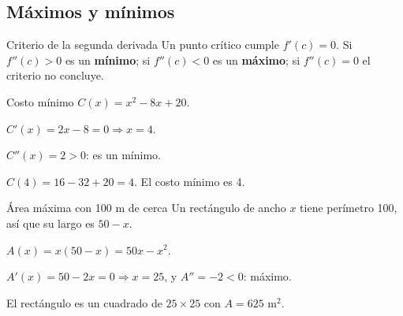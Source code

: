 

\subsection{M\'aximos y m\'inimos}
\begin{tmdef}{Criterio de la segunda derivada}
Un punto cr\'itico cumple $f'(c)=0$. Si $f''(c)>0$ es un \textbf{m\'inimo}; si $f''(c)<0$ es un \textbf{m\'aximo}; si $f''(c)=0$ el criterio no concluye.
\end{tmdef}

\begin{center}
\end{center}

\begin{tmejemplo}{Costo m\'inimo}
$C(x)=x^2-8x+20$.
\begin{tmpasos}
\item $C'(x)=2x-8=0\Rightarrow x=4$.
\item $C''(x)=2>0$: es un m\'inimo.
\item $C(4)=16-32+20=4$. El costo m\'inimo es 4.
\end{tmpasos}
\end{tmejemplo}

\begin{tmejemplo}{\'Area m\'axima con 100 m de cerca}
Un rect\'angulo de ancho $x$ tiene per\'imetro 100, as\'i que su largo es $50-x$.
\begin{tmpasos}
\item $A(x)=x(50-x)=50x-x^2$.
\item $A'(x)=50-2x=0\Rightarrow x=25$, y $A''=-2<0$: m\'aximo.
\item El rect\'angulo es un cuadrado de $25\times25$ con $A=625$ m$^2$.
\end{tmpasos}
\end{tmejemplo}


